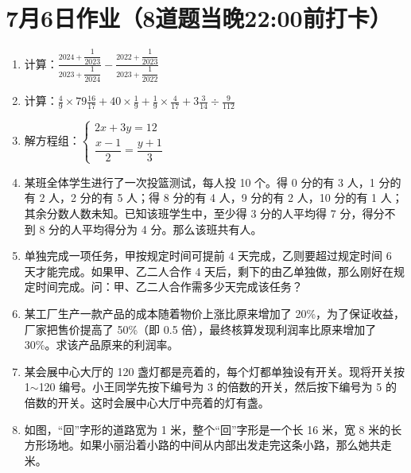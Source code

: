 \documentclass[UTF8,12pt,a4paper]{ctexart}
\newcommand{\BottomWriteSpace}{0.5cm}
\newenvironment{OnePageEightFill}{
  \small
  \vspace*{0pt}
  \begin{enumerate}[leftmargin=*, itemsep=0pt, topsep=0pt, parsep=0pt, partopsep=0pt]
  \setlength{\parskip}{0pt}
}{
  \end{enumerate}
  \vspace*{\BottomWriteSpace}
  \normalsize
  \newpage
}
\newcommand{\Q}[1]{\item #1\par\vfill}
\newcommand{\Qlast}[1]{\item #1\par}
\begin{document}
\section*{7月6日作业（8道题当晚22:00前打卡）}
\begin{OnePageEightFill}

\Q{计算：$\displaystyle \frac{2024 + \dfrac{1}{2023}}{2023 + \dfrac{1}{2024}} - \frac{2022 + \dfrac{1}{2023}}{2023 + \dfrac{1}{2022}}$}

\Q{计算：$\displaystyle \frac{4}{9} \times 79\frac{16}{17} + 40 \times \frac{1}{9} + \frac{1}{9} \times \frac{4}{17} + 3\frac{3}{14} \div \frac{9}{112}$}

\Q{解方程组：$\begin{cases} 2x + 3y = 12 \\ \dfrac{x-1}{2} = \dfrac{y+1}{3} \end{cases}$}

\Q{某班全体学生进行了一次投篮测试，每人投 10 个。得 0 分的有 3 人，1 分的有 2 人，2 分的有 5 人；得 8 分的有 4 人，9 分的有 2 人，10 分的有 1 人；其余分数人数未知。已知该班学生中，至少得 3 分的人平均得 7 分，得分不到 8 分的人平均得分为 4 分。那么该班共有\underline{\hspace{3em}}人。}

\Q{单独完成一项任务，甲按规定时间可提前 4 天完成，乙则要超过规定时间 6 天才能完成。如果甲、乙二人合作 4 天后，剩下的由乙单独做，那么刚好在规定时间完成。问：甲、乙二人合作需多少天完成该任务？}

\Q{某工厂生产一款产品的成本随着物价上涨比原来增加了 20\%，为了保证收益，厂家把售价提高了 50\%（即 0.5 倍），最终核算发现利润率比原来增加了 30\%。求该产品原来的利润率。}

\Q{某会展中心大厅的 120 盏灯都是亮着的，每个灯都单独设有开关。现将开关按 1$\sim$120 编号。小王同学先按下编号为 3 的倍数的开关，然后按下编号为 5 的倍数的开关。这时会展中心大厅中亮着的灯有\underline{\hspace{3em}}盏。}

\Qlast{如图，“回”字形的道路宽为 1 米，整个“回”字形是一个长 16 米，宽 8 米的长方形场地。如果小丽沿着小路的中间从内部出发走完这条小路，那么她共走\underline{\hspace{3em}}米。}

\end{OnePageEightFill}

\end{document}
